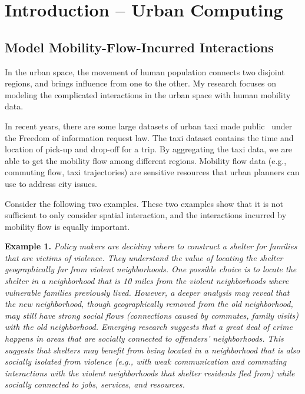 \chapter{Introduction -- Urban Computing} 
\label{chapter1:introduction}





\section{Model Mobility-Flow-Incurred Interactions}


In the urban space, the movement of human population connects two disjoint regions, and brings influence from one to the other. My research focuses on modeling the complicated interactions in the urban space with human mobility data.  


In recent years, there are some large datasets of urban taxi made public~\cite{nyctaxi} under the Freedom of information request law.  The taxi dataset contains the time and location of pick-up and drop-off for a trip. By aggregating the taxi data, we are able to get the mobility flow among different regions.
Mobility flow data (e.g., commuting flow, taxi trajectories) are sensitive resources that urban planners can use to address city issues.




Consider the following two examples. These two examples show that it is not sufficient to only consider spatial interaction, and the interactions incurred by mobility flow is equally important.


\textbf{Example 1.} \emph{Policy makers are deciding where to construct a shelter for families that are victims of violence. They understand the value of locating the shelter geographically far from violent neighborhoods. One possible choice is to locate the shelter in a neighborhood that is 10 miles from the violent neighborhoods where vulnerable families previously lived. However, a deeper analysis may reveal that the new neighborhood, though geographically removed from the old neighborhood, may still have strong social flows (connections caused by commutes, family visits) with the old neighborhood. Emerging research suggests that a great deal of crime happens in areas that are socially connected to offenders' neighborhoods. This suggests that shelters may benefit from being located in a neighborhood that is also socially isolated from violence (e.g., with weak communication and commuting interactions with the violent neighborhoods that shelter residents fled from) while socially connected to jobs, services, and resources.}


